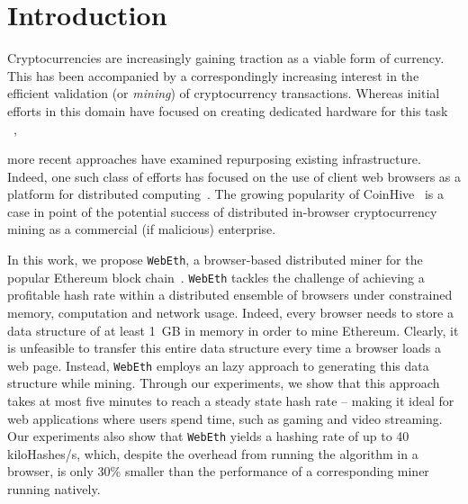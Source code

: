 \documentclass[runningheads]{llncs}
\newcommand{\trishita}[1]{}%
\begin{document}
\section{Introduction}
Cryptocurrencies are increasingly gaining traction as a viable form of currency.  This has been accompanied by a correspondingly increasing interest in the efficient validation (or \emph{mining}) of cryptocurrency transactions.  Whereas initial efforts in this domain have focused on creating dedicated hardware for this task ~\cite{asics}, %
\trishita{Add citation}
more recent approaches have examined repurposing existing infrastructure. Indeed, one such class of efforts has focused on the use of client web browsers as a platform for distributed computing~\cite{Cushing}. The growing popularity of CoinHive~\cite{coinhive} is a case in point of the potential success of distributed in-browser cryptocurrency mining as a commercial (if malicious) enterprise. 

In this work, we propose \verb|WebEth|, a browser-based distributed miner for the popular Ethereum block chain~\cite{ethereum}. \verb|WebEth| tackles the challenge of achieving a profitable hash rate within a distributed ensemble of browsers under constrained memory, computation and network usage. Indeed, every browser needs to store a data structure of at least 1~GB in memory in order to mine Ethereum. Clearly, it is unfeasible to transfer this entire data structure every time a browser loads a web page. Instead, \verb|WebEth| employs an lazy approach to generating this data structure while mining. Through our experiments, we show that this approach takes at most five minutes to reach a steady state hash rate -- making it ideal for web applications where users spend time, such as gaming and video streaming. Our experiments also show that \verb|WebEth| yields a hashing rate of up to 40 kiloHashes/s, which, despite the overhead from running the algorithm in a browser, is only 30\% smaller than the performance of a corresponding miner running natively. 

\end{document}
